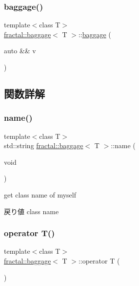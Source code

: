 \mbox{\label{classfractal_1_1baggage_ab3ab6b144d0fb9ee68d8f4810a4749f4}} 
\subsubsection{\texorpdfstring{baggage()}{baggage()}\hspace{0.1cm}{\footnotesize\ttfamily [3/3]}}
{\footnotesize\ttfamily template$<$class T$>$ \\
\hyperlink{classfractal_1_1baggage}{fractal\+::baggage}$<$ T $>$\+::\hyperlink{classfractal_1_1baggage}{baggage} (\begin{DoxyParamCaption}\item[{auto \&\&}]{v }\end{DoxyParamCaption})\hspace{0.3cm}{\ttfamily [inline]}}



\subsection{関数詳解}
\mbox{\label{classfractal_1_1baggage_ab9ce449071afe7e188a49d4a0be8d5f1}} 
\subsubsection{\texorpdfstring{name()}{name()}}
{\footnotesize\ttfamily template$<$class T$>$ \\
std\+::string \hyperlink{classfractal_1_1baggage}{fractal\+::baggage}$<$ T $>$\+::name (\begin{DoxyParamCaption}\item[{void}]{ }\end{DoxyParamCaption})\hspace{0.3cm}{\ttfamily [inline]}}



get class name of myself 

\begin{DoxyReturn}{戻り値}
class name 
\end{DoxyReturn}
\mbox{\label{classfractal_1_1baggage_a404f89564a219ffceb983cd3c77610e5}} 
\subsubsection{\texorpdfstring{operator T()}{operator T()}}
{\footnotesize\ttfamily template$<$class T$>$ \\
\hyperlink{classfractal_1_1baggage}{fractal\+::baggage}$<$ T $>$\+::operator T (\begin{DoxyParamCaption}{ }\end{DoxyParamCaption})\hspace{0.3cm}{\ttfamily [inline]}}



